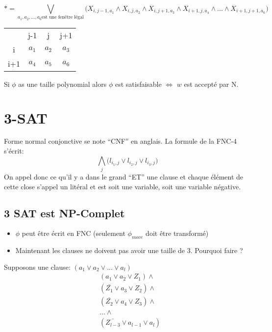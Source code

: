 \documentclass[a4paper,12pt]{article}
\begin{document}
    $$* = \bigvee\limits_{a_1, a_2, ..., a_6\text{est une fenêtre légal}} \big(X_{i, j-1, a_1} \wedge X_{i, j, a_2} \wedge X_{i, j+1, a_3} \wedge X_{i+1, j, a_4} \wedge ... \wedge X_{i+1, j+1, a_6}\big)$$
    
    \begin{table}[h]
      \centering
      \begin{tabular}{cccc}
			      & j-1                         & j                          & j+1                        \\ \cline{2-4} 
      \multicolumn{1}{c|}{i}   & \multicolumn{1}{c|}{$a_1$} & \multicolumn{1}{c|}{$a_2$} & \multicolumn{1}{c|}{$a_3$} \\ \cline{2-4} 
      \multicolumn{1}{c|}{i+1} & \multicolumn{1}{c|}{$a_4$} & \multicolumn{1}{c|}{$a_5$} & \multicolumn{1}{c|}{$a_6$} \\ \cline{2-4} 
      \end{tabular}
    \end{table}
    
    Si $\phi$ as une taille polynomial alors $\phi$ est satisfaisable $\Leftrightarrow$ $w$ est accepté par N.
    
    
\section{3-SAT}
  Forme normal conjonctive se note ``CNF'' en anglais.  La formule de la FNC-4 s'écrit:
  $$\bigwedge\limits_{j} \big(l_{i_1, j} \vee l_{i_2, j} \vee l_{i_3, j} \big)$$
  On appel donc ce qu'il y a dans le grand ``ET'' une clause et chaque élément de cette close s'appel un litéral et est soit une variable, soit une variable négative.
  
  \subsection{3 SAT est NP-Complet}
    \begin{itemize}
      \item $\phi$ peut être écrit en FNC (seulement $\phi_{move}$ doit être transformé)
      \item Maintenant les clauses ne doivent pas avoir une taille de 3. Pourquoi faire ?
    \end{itemize}
    
    Supposons une clause: $(a_1 \vee a_2 \vee ... \vee a_l)$
    \begin{align*}
      &(a_1 \vee a_2 \vee Z_1) \wedge \\
      &(\bar{Z_1} \vee a_3 \vee Z_2) \wedge \\
      &(\bar{Z_2} \vee a_4 \vee Z_3) \wedge \\
      &... \wedge\\
      &(\bar{Z_{l-3}} \vee a_{l-1} \vee a_l)
    \end{align*}
    
\end{document}
